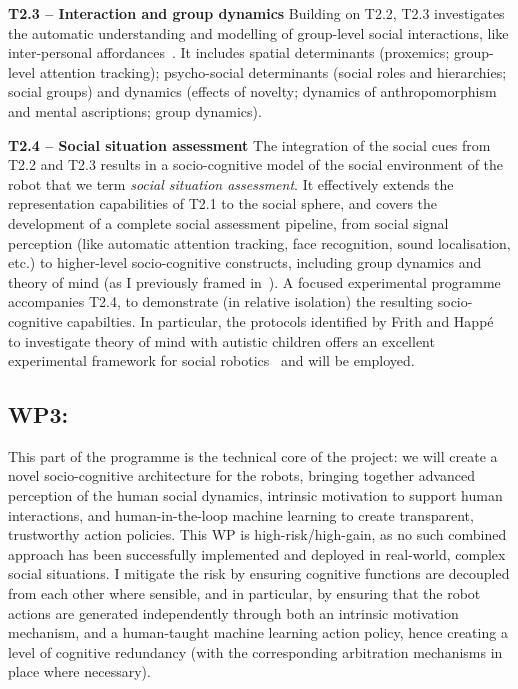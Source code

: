 \documentclass[11pt,a4paper]{report}
\begin{document}
\textbf{T2.3 -- Interaction and group dynamics} Building on T2.2, T2.3
investigates the automatic understanding and modelling of group-level social
interactions, like inter-personal affordances~\cite{pandey2013affordance}. It
includes spatial determinants (proxemics; group-level attention tracking);
psycho-social determinants (social roles and hierarchies; social groups) and
dynamics (effects of novelty; dynamics of anthropomorphism and mental
ascriptions; group dynamics). 


\textbf{T2.4 -- Social situation assessment} The integration of the social cues
from T2.2 and T2.3 results in a socio-cognitive model of the social environment
of the robot that we term \emph{social situation assessment}.  It effectively
extends the representation capabilities of T2.1 to the social sphere, and covers
the development of a complete social assessment pipeline, from social signal
perception (like automatic attention tracking, face recognition, sound
localisation, etc.) to higher-level socio-cognitive constructs, including group
dynamics and theory of mind (as I previously framed
in~\cite{lemaignan2015mutual, dillenbourg2016symmetry}). A focused experimental
programme accompanies T2.4, to demonstrate (in relative isolation) the resulting
socio-cognitive capabilties. In particular, the protocols identified by Frith
and Happé~\cite{frith1994autism} to investigate theory of mind with autistic
children offers an excellent experimental framework for social
robotics~\cite{lemaignan2015mutual} and will be employed.

\subsection{WP3: \textbf{\wpThree}}

\noindent{}

This part of the programme is the technical core of the project: we will create a
novel socio-cognitive architecture for the robots, bringing together advanced
perception of the human social dynamics, intrinsic motivation to support human
interactions, and human-in-the-loop machine learning to create transparent,
trustworthy action policies. This WP is high-risk/high-gain, as no such combined
approach has been successfully implemented and deployed in real-world, complex
social situations. I mitigate the risk by ensuring cognitive functions are
decoupled from each other where sensible, and in particular, by ensuring that
the robot actions are generated independently through both an intrinsic
motivation mechanism, and a human-taught machine learning action policy, hence
creating a level of cognitive redundancy (with the corresponding arbitration
mechanisms in place where necessary).
\end{document}
